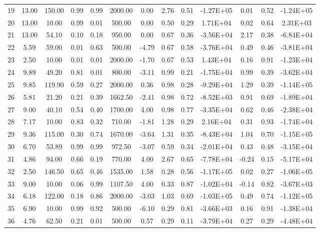 \begin{landscape}
\begin{center}
\begin{longtable}{|c|c|c|c|c|c|c|c|c|c|c|c|c|}
19  & 13.00 & 150.00 & 0.99 & 0.99 & 2000.00 & 0.00  & 2.76  & 0.51 & -1.27E+05 & 0.01  & 0.52 & -1.24E+05 \\
20  & 13.00 & 10.00  & 0.99 & 0.01 & 500.00  & 0.00  & 0.50  & 0.29 & 1.71E+04  & 0.02  & 0.64 & 2.31E+03  \\
21  & 13.00 & 54.10  & 0.10 & 0.18 & 950.00  & 0.00  & 0.67  & 0.36 & -3.56E+04 & 2.17  & 0.38 & -6.84E+04 \\
22  & 5.59  & 59.00  & 0.01 & 0.63 & 500.00  & -4.79 & 0.67  & 0.58 & -3.76E+04 & 0.49  & 0.46 & -3.81E+04 \\
23  & 2.50  & 10.00  & 0.01 & 0.01 & 2000.00 & -1.70 & 0.67  & 0.53 & 1.43E+04  & 0.16  & 0.91 & -1.23E+04 \\
24  & 9.89  & 49.20  & 0.81 & 0.01 & 800.00  & -3.11 & 0.99  & 0.21 & -1.75E+04 & 0.99  & 0.39 & -3.62E+04 \\
25  & 9.85  & 119.90 & 0.59 & 0.27 & 2000.00 & 0.36  & 0.98  & 0.28 & -9.29E+04 & 1.29  & 0.39 & -1.14E+05 \\
26  & 5.81  & 21.20  & 0.21 & 0.39 & 1662.50 & -2.41 & 0.98  & 0.72 & -8.52E+03 & 0.91  & 0.69 & -1.89E+04 \\
27  & 9.00  & 40.10  & 0.54 & 0.40 & 1700.00 & 4.00  & 0.98  & 0.77 & -3.35E+04 & 0.62  & 0.46 & -2.38E+04 \\
28  & 7.17  & 10.00  & 0.83 & 0.32 & 710.00  & -1.81 & 1.28  & 0.29 & 2.16E+04  & 0.31  & 0.93 & -1.74E+04 \\
29  & 9.36  & 115.00 & 0.30 & 0.74 & 1670.00 & -3.64 & 1.31  & 0.35 & -8.43E+04 & 1.04  & 0.70 & -1.15E+05 \\
30  & 6.70  & 53.89  & 0.99 & 0.99 & 972.50  & -3.07 & 0.59  & 0.34 & -2.01E+04 & 0.43  & 0.48 & -3.15E+04 \\
31  & 4.86  & 94.00  & 0.66 & 0.19 & 770.00  & 4.00  & 2.67  & 0.65 & -7.78E+04 & -0.24 & 0.15 & -5.17E+04 \\
32  & 2.50  & 146.50 & 0.65 & 0.46 & 1535.00 & 1.58  & 0.28  & 0.56 & -1.17E+05 & 0.02  & 0.27 & -1.06E+05 \\
33  & 9.00  & 10.00  & 0.06 & 0.99 & 1107.50 & 4.00  & 0.33  & 0.87 & -1.02E+04 & -0.14 & 0.82 & -3.67E+03 \\
34  & 6.18  & 122.00 & 0.18 & 0.86 & 2000.00 & -3.03 & 1.03  & 0.69 & -1.03E+05 & 0.49  & 0.74 & -1.12E+05 \\
35  & 6.90  & 10.00  & 0.99 & 0.92 & 500.00  & -6.10 & 0.29  & 0.81 & -3.66E+03 & 0.16  & 0.91 & -1.38E+04 \\
36  & 4.76  & 62.50  & 0.21 & 0.01 & 500.00  & 0.57  & 0.29  & 0.11 & -3.79E+04 & 0.27  & 0.29 & -4.48E+04 \\

\end{longtable}
\end{center}
\end{landscape}
